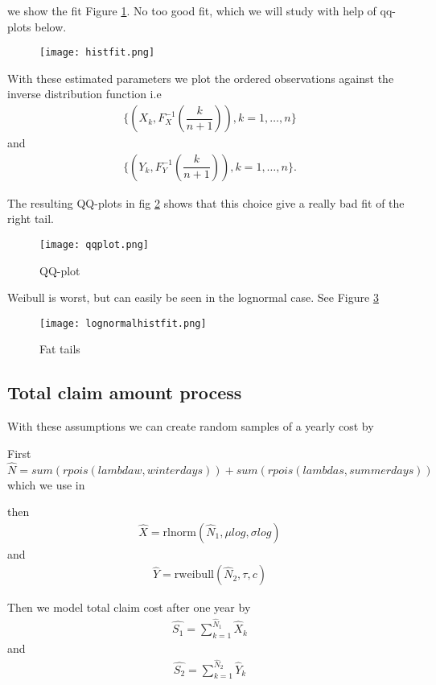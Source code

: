 \documentclass[11pt]{article}
\begin{document}
we show the fit Figure \ref{fig:samplefig3}. No too good fit, which we will study with help of qq-plots below.


 \begin{figure}[H]
 \center
  \texttt{[image: histfit.png]}
  \label{fig:samplefig3}
\end{figure}

With these estimated parameters we plot the ordered observations against the inverse distribution function  i.e
\begin{align*}
	\bigg\{ \left( X_k, F_X^{-1}\left(\dfrac{k}{n+1}\right)\right),k=1,\dots,n \bigg\}
\end{align*}
and
\begin{align*}
	\bigg\{ \left( Y_k, F_Y^{-1}\left(\dfrac{k}{n+1}\right)\right),k=1,\dots,n \bigg\}.
\end{align*}

The resulting QQ-plots in fig \ref{fig:qqplot} shows that this choice give a really bad fit of the right tail.

 \begin{figure}[H]
 \center
  \texttt{[image: qqplot.png]}
  \caption{QQ-plot}
  \label{fig:qqplot}
\end{figure}

Weibull is worst, but can easily be seen in the lognormal case. See Figure \ref{fig:fit}

 \begin{figure}[H]
 \center
  \texttt{[image: lognormalhistfit.png]}
  \caption{Fat tails}
  \label{fig:fit}
\end{figure}

\subsection*{Total claim amount process}
With these assumptions we can 
 create random samples of a yearly cost by

First $\hat{N} =  sum(rpois(lambdaw,winterdays)) +  sum(rpois(lambdas,summerdays))$
which we use in

then
\begin{align*} 
	\hat{X} = \mathrm{rlnorm}(\hat{N}_1,\mu log,\sigma log) 
\end{align*}
and
\begin{align*} 
	 \hat{Y} =\mathrm{ rweibull}(\hat{N}_2,\tau,c)
\end{align*}


Then we model total claim cost after one year by
\begin{align} \label{eq:sum1}
	\hat{S_1} = \sum_{k=1}^{\hat{N}_1} \hat{ X}_k   
\end{align}
and
\begin{align} \label{eq:sum2}
	 \hat{S_2} = \sum_{k=1}^{\hat{N}_2} \hat{Y}_k
\end{align}
\end{document}
